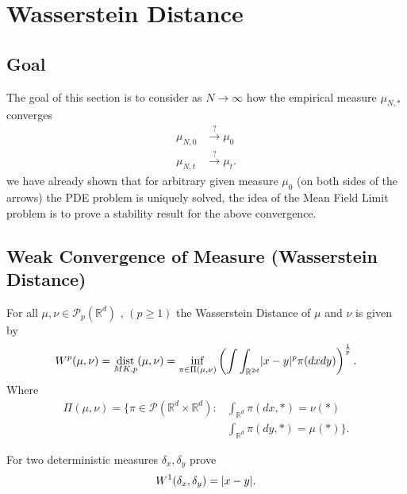 \section{Wasserstein Distance}
\subsection{Goal}
The goal of this section is to consider  as $N \to  \infty$ how the empirical measure $\mu_{N,*}$ converges 
\begin{align*}
  \mu_{N,0} &\xrightarrow{?} \mu_0 \\
  \mu_{N,t} &\xrightarrow{?} \mu_t
.\end{align*}
we have already shown that for arbitrary given measure $\mu_0$ (on both sides of the arrows)  the PDE problem is uniquely solved,
the idea of the Mean Field Limit problem is to prove a stability result for the above convergence.
\subsection{Weak Convergence of Measure (Wasserstein Distance)}
\begin{definition}
  For all $\mu , \nu  \in  \mathcal{P}_p(\mathbb{R}^{d} )$  , $(p\ge 1) $ the Wasserstein Distance of $\mu $ and $\nu $ is given by 
  \begin{align*}
    W^{p}(\mu ,\nu ) = \operatorname*{dist}_{MK,p}(\mu ,\nu ) = \inf_{\pi \in  \Pi(\mu ,\nu )} \left( \int \int_{\mathbb{R}^{2d} } \lvert x-y\rvert^{p} \pi(dxdy) \right)^{\frac{1}{p}}  
  .\end{align*}
  Where  
  \begin{align*}
    \Pi(\mu ,\nu ) = \{\pi \in \mathcal{P}(\mathbb{R}^{d} \times  \mathbb{R}^{d}  ) : &\int_{\mathbb{R}^{d} } \pi(dx,*) = \nu(*) \\
                                                                                      &\int_{\mathbb{R}^{d} } \pi(dy,*) = \mu(*)\}  
  .\end{align*}
\end{definition}
\begin{exercise}
 For two deterministic measures $\delta_x,\delta_y$ prove 
 \begin{align*}
  W^{1}(\delta_x,\delta_y)  = \lvert x - y\rvert
 .\end{align*}
\end{exercise}
